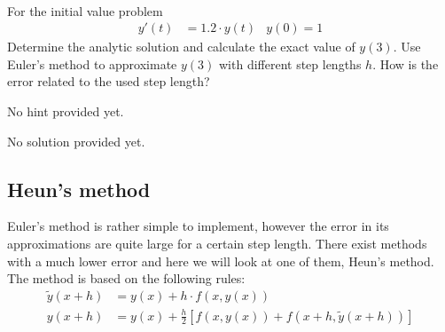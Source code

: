 \begin{ex}
\label{excEulerConvergence} \\
For the initial value problem
\begin{align}
y'(t)
	& = 1.2 \cdot y(t) 	&
y(0) = 1
\end{align}
Determine the analytic solution and calculate the exact value of $y(3)$.
Use Euler's method to approximate $y(3)$ with different step lengths $h$.
How is the error related to the used step length?
\begin{hint}
No hint provided yet.
\end{hint}
\begin{sol}
No solution provided yet.
\end{sol}
\end{ex}


\subsection{Heun's method}

Euler's method is rather simple to implement, however the 
error in its approximations are quite large for a certain step 
length.
There exist methods with a much lower error and here we will look 
at one of them, Heun's method.
The method is based on the following rules:
\begin{align*}
\tilde{y}(x + h) & = y(x) + h \cdot f(x, y(x)) \\
y(x + h) & = y(x) + \frac{h}{2} \left[f(x, y(x)) + f(x + h, \tilde{y}(x + h))\right]
\end{align*}




